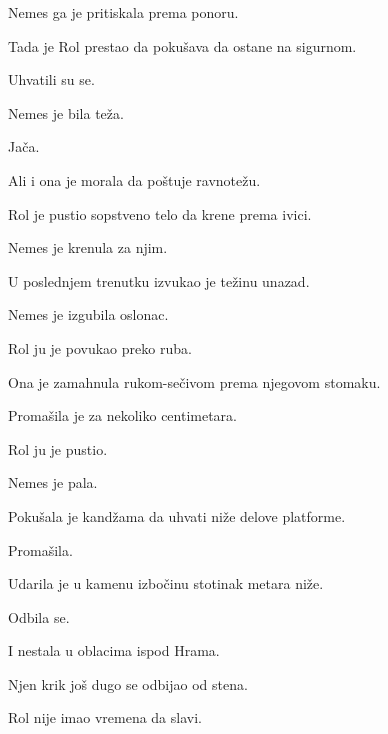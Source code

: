 \bigskip

Nemes ga je pritiskala prema ponoru.

\bigskip

Tada je Rol prestao da pokušava da ostane na sigurnom.

\bigskip

Uhvatili su se.

\bigskip

Nemes je bila teža.

Jača.

\bigskip

Ali i ona je morala da poštuje ravnotežu.

\bigskip

Rol je pustio sopstveno telo da krene prema ivici.

\bigskip

Nemes je krenula za njim.

\bigskip

U poslednjem trenutku izvukao je težinu unazad.

\bigskip

Nemes je izgubila oslonac.

\bigskip

Rol ju je povukao preko ruba.

\bigskip

Ona je zamahnula rukom-sečivom prema njegovom stomaku.

\bigskip

Promašila je za nekoliko centimetara.

\bigskip

Rol ju je pustio.

\bigskip

Nemes je pala.

\bigskip

Pokušala je kandžama da uhvati niže delove platforme.

\bigskip

Promašila.

\bigskip

Udarila je u kamenu izbočinu stotinak metara niže.

Odbila se.

\bigskip

I nestala u oblacima ispod Hrama.

\bigskip

Njen krik još dugo se odbijao od stena.

\bigskip

Rol nije imao vremena da slavi.

